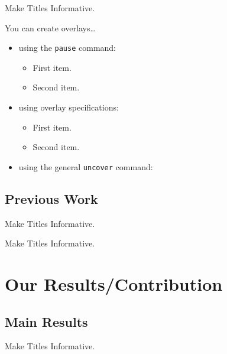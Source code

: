 \documentclass{beamer}
\begin{document}
\begin{frame}{Make Titles Informative.}

  You can create overlays\dots
  \begin{itemize}
  \item using the \texttt{pause} command:
    \begin{itemize}
    \item
      First item.
      \pause
    \item    
      Second item.
    \end{itemize}
  \item
    using overlay specifications:
    \begin{itemize}
    \item<3->
      First item.
    \item<4->
      Second item.
    \end{itemize}
  \item
    using the general \texttt{uncover} command:
    \begin{itemize}
    \end{itemize}
  \end{itemize}
\end{frame}


\subsection{Previous Work}

\begin{frame}{Make Titles Informative.}
\end{frame}

\begin{frame}{Make Titles Informative.}
\end{frame}



\section{Our Results/Contribution}

\subsection{Main Results}

\begin{frame}{Make Titles Informative.}
\end{frame}
\end{document}
